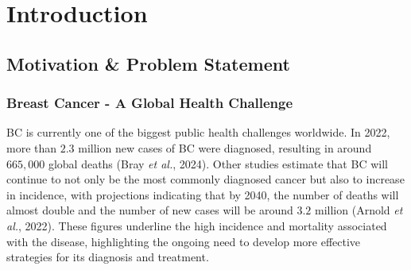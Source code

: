 
%

\chapter{Introduction}
\label{cha:introduction}



\section{Motivation \& Problem Statement}
\label{sec:motivation+problem-statement}
\subsection{Breast Cancer - A Global Health Challenge}
\gls{BC} is currently one of the biggest public health challenges worldwide. In 2022, 
more than $2.3$ million new cases of \gls{BC} were diagnosed, resulting in around $665,\!000$ global deaths 
\cite{bcaData2024_bray} (Bray \textit{et al.}, 2024). Other studies estimate that \gls{BC} will continue to not only be 
the most commonly diagnosed cancer but also to increase in incidence, with projections indicating that by 2040, the number 
of deaths will almost double and the number of new cases will be around $3.2$ million \cite{bca_data_Arnold2022Current} 
(Arnold \textit{et al.}, 2022). These figures underline the high incidence and mortality 
associated with the disease, highlighting the ongoing need to develop more effective strategies for its diagnosis 
and treatment.

